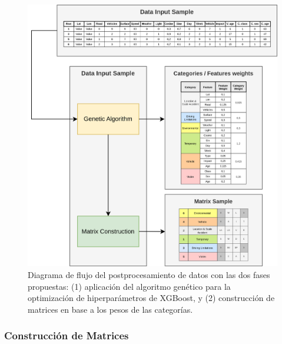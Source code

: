 \documentclass{uathesis-es}
\begin{document}
\begin{figure}[H]
    \centering
    \includegraphics[width=14cm]{Figures/Postprocessing_2.png}
    \caption{Diagrama de flujo del postprocesamiento de datos con las dos fases propuestas: (1) aplicación del algoritmo genético para la optimización de hiperparámetros de XGBoost, y (2) construcción de matrices en base a los pesos de las categorías.}
    \label{PostprocessingStage}
\end{figure}

\subsubsection{Construcción de Matrices}
\end{document}

